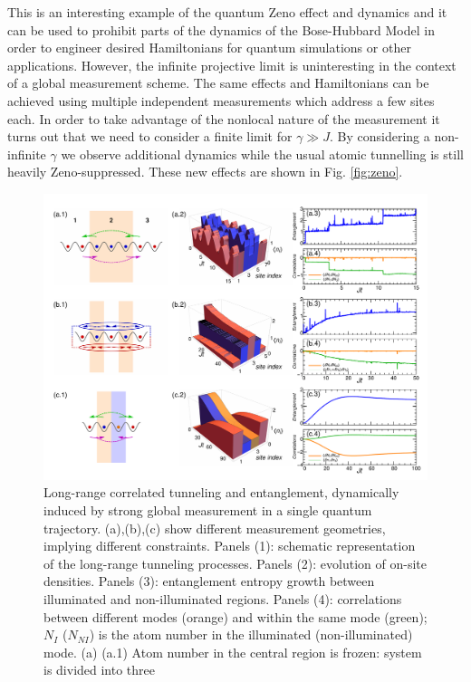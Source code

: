 This is an interesting example of the quantum Zeno effect and dynamics
and it can be used to prohibit parts of the dynamics of the
Bose-Hubbard Model in order to engineer desired Hamiltonians for
quantum simulations or other applications. However, the infinite
projective limit is uninteresting in the context of a global
measurement scheme. The same effects and Hamiltonians can be achieved
using multiple independent measurements which address a few sites
each. In order to take advantage of the nonlocal nature of the
measurement it turns out that we need to consider a finite limit for
$\gamma \gg J$. By considering a non-infinite $\gamma$ we observe
additional dynamics while the usual atomic tunnelling is still heavily
Zeno-suppressed. These new effects are shown in Fig. \ref{fig:zeno}.

\begin{figure}[hbtp!]
  \includegraphics[width=\textwidth]{Zeno.pdf}
  \caption[Emergent Long-Range Correlated Tunnelling]{ Long-range
    correlated tunneling and entanglement, dynamically induced by
    strong global measurement in a single quantum
    trajectory. (a),(b),(c) show different measurement geometries,
    implying different constraints. Panels (1): schematic
    representation of the long-range tunneling processes. Panels (2):
    evolution of on-site densities. Panels (3): entanglement entropy
    growth between illuminated and non-illuminated regions. Panels
    (4): correlations between different modes (orange) and within the
    same mode (green); $N_I$ ($N_{NI}$) is the atom number in the
    illuminated (non-illuminated) mode.  (a) (a.1) Atom number in the
    central region is frozen: system is divided into three
}
\end{figure}
